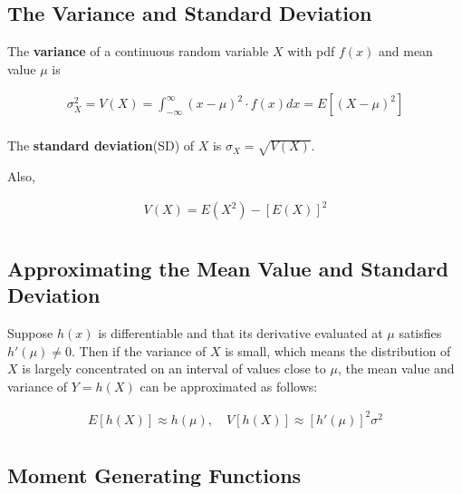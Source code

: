 \subsection{The Variance and Standard Deviation}

\begin{definition}
    The \textbf{variance} of a continuous random variable $X$ with pdf $f(x)$ and mean value $\mu$ is

    \begin{align*}
        \sigma_X^2 = V(X) = \int_{-\infty}^\infty (x-\mu)^2\cdot f(x) dx = E[(X-\mu)^2] \\
    \end{align*}

    The \textbf{standard deviation}(SD) of $X$ is $\sigma_X = \sqrt{V(X)}$.

    Also,

    \begin{align*}
        V(X) = E(X^2) - [E(X)]^2 \\
    \end{align*}
\end{definition}

\subsection{Approximating the Mean Value and Standard Deviation}

\begin{proposition}
    Suppose $h(x)$ is differentiable and that its derivative evaluated at $\mu$ satisfies $h'(\mu)\neq 0$. Then if the variance of $X$ is small, which means the distribution of $X$ is largely concentrated on an interval of values close to $\mu$, the mean value and variance of $Y=h(X)$ can be approximated as follows:

    \begin{align*}
        E[h(X)] \approx h(\mu),\quad V[h(X)] \approx [h'(\mu)]^2\sigma^2 \\
    \end{align*}
\end{proposition}

\subsection{Moment Generating Functions}


